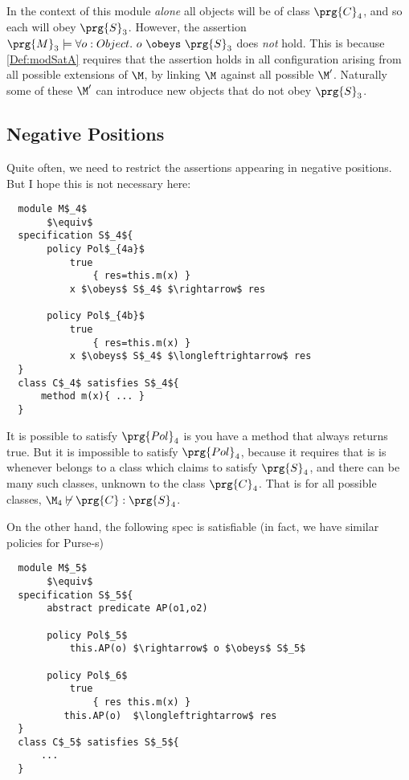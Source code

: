 In the context of this module \emph{alone} all objects will be of class
$\prg{C}_4$, and so each will obey $\prg{S}_3$. However, the assertion
$\prg{M}_3 \models \forall o:Object.\ o\ \obeys\ \prg{S}_3$ does \emph{not} hold. This is because \autoref{Def:modSatA} requires that the assertion holds in all configuration arising from all possible extensions of $\M$, by linking
$\M$ against all possible $\M'$. Naturally some of these $\M'$ can introduce
new objects that do not obey $\prg{S}_3$.

\subsection{Negative Positions}

Quite often, we need to restrict the assertions appearing in negative positions. But I hope this is not necessary here:
 \begin{lstlisting}
  module M$_4$
       $\equiv$
  specification S$_4${
       policy Pol$_{4a}$
           true
               { res=this.m(x) }
           x $\obeys$ S$_4$ $\rightarrow$ res
           
       policy Pol$_{4b}$
           true
               { res=this.m(x) }
           x $\obeys$ S$_4$ $\longleftrightarrow$ res
  }
  class C$_4$ satisfies S$_4${
      method m(x){ ... }
  }
\end{lstlisting}

It is possible to satisfy  $\prg{Pol}_4$ is you have a method that always returns true. But it is 
impossible to satisfy $\prg{Pol}_4$, because it requires that  is is  
whenever  belongs to a class which claims to satisfy $\prg{S}_4$, and there can be many such classes, unknown to the class $\prg{C}_4$. That is for all possible classes, $\M_4 \not\vdash \prg{C}: \prg{S}_4$.

On the other hand, the following spec is satisfiable (in fact, we have similar policies for Purse-s)

\begin{lstlisting}
  module M$_5$
       $\equiv$
  specification S$_5${
       abstract predicate AP(o1,o2)

       policy Pol$_5$
           this.AP(o) $\rightarrow$ o $\obeys$ S$_5$

       policy Pol$_6$
           true
               { res this.m(x) }
          this.AP(o)  $\longleftrightarrow$ res
  }
  class C$_5$ satisfies S$_5${
      ...
  }
\end{lstlisting}

